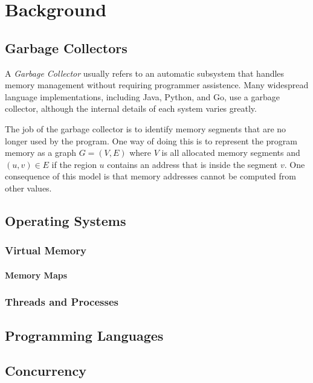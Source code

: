 \chapter{Background}


\section{Garbage Collectors}

A \emph{Garbage Collector} usually refers to an automatic subsystem that handles memory management
without requiring programmer assistence. Many widespread language implementations,
including Java, Python, and Go, use a garbage collector, although the internal details of each
system varies greatly.

The job of the garbage collector is to identify memory segments that are no longer used by the
program. One way of doing this is to represent the program memory as a graph $G=(V, E)$ where $V$ is
all allocated memory segments and $(u, v) \in E$ if the region $u$ contains an address that is
inside the segment $v$. One consequence of this model is that memory addresses cannot be computed
from other values.


\section{Operating Systems}
\lorem{}

\subsection{Virtual Memory}
\lorem{}

\subsubsection{Memory Maps\label{sec:memory-map}}
\lorem{}


\subsection{Threads and Processes}
\lorem{}


\section{Programming Languages}
\lorem{}


\section{Concurrency}
\lorem{}


